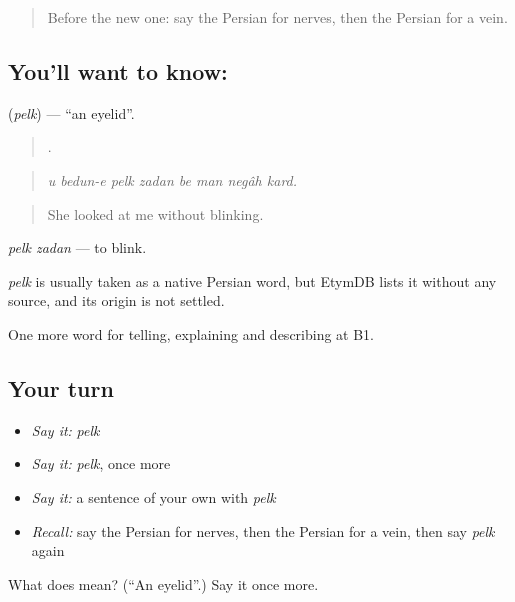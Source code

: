 \begin{quote}
Before the new one: say the Persian for nerves, then the Persian for a vein.
\end{quote}

\subsection*{You'll want to know: }
\textbf{} (\emph{pelk}) — \textquotedblleft{}an eyelid\textquotedblright{}.

\begin{quote}
       .
\end{quote}

\begin{quote}
\emph{u bedun-e pelk zadan be man negâh kard.}
\end{quote}

\begin{quote}
She looked at me without blinking.
\end{quote}

\emph{pelk zadan} — to blink.

\begin{cousinweb}
\emph{pelk} is usually taken as a native Persian word, but EtymDB lists it without any source, and its origin is not settled.
\end{cousinweb}

\begin{grammarlens}[title={What you've built}]
One more word for telling, explaining and describing at B1.
\end{grammarlens}

\subsection*{Your turn}
\begin{itemize}
\raggedright
  \item \emph{Say it:} \emph{pelk}
  \item \emph{Say it:} \emph{pelk}, once more
  \item \emph{Say it:} a sentence of your own with \emph{pelk}
  \item \emph{Recall:} say the Persian for nerves, then the Persian for a vein, then say \emph{pelk} again
\end{itemize}

\begin{tcolorbox}[breakable,colback=teal!4,colframe=teal!35!black,title={Before you move on}]
What does  mean? (\textquotedblleft{}An eyelid\textquotedblright{}.) Say it once more.
\end{tcolorbox}
